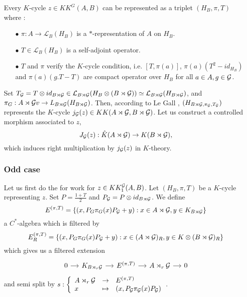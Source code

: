 Every $K$-cycle $z\in KK^G(A,B)$ can be represented as a triplet $(H_B, \pi, T)$ where :
\begin{itemize}
\item[$\bullet$]$\pi : A\rightarrow \mathcal L_B(H_B)$ is a $*$-representation of $A$ on $H_B$.
\item[$\bullet$]$T\in \mathcal L_B(H_B)$ is a self-adjoint operator.
\item[$\bullet$] $T$ and $\pi$ verify the $K$-cycle condition, i.e. $[T,\pi(a)]$, $\pi(a)(T^2-id_{H_B})$ and $\pi(a)(g.T-T)$ are compact operator over $H_B$ for all $a\in A, g\in \mathcal G$.\\
\end{itemize}

Set $T_\mathcal G= T\otimes id_{B\rtimes \mathcal G}\in \mathcal L_{B\rtimes \mathcal G}(H_B\otimes (B\rtimes \mathcal G))\simeq \mathcal L_{B\rtimes \mathcal G}(H_{B\rtimes\mathcal G})$, and $\pi_G: A\rtimes \mathcal G v\rightarrow L_{B\rtimes \mathcal G}(H_{B\rtimes\mathcal G})$. Then, according to Le Gall \cite{LeGall}, $(H_{B\rtimes\mathcal G, \pi_\mathcal G, T_\mathcal G})$ represents the $K$-cycle $j_\mathcal G(z)\in KK(A\rtimes \mathcal G,B\rtimes \mathcal G)$. Let us construct a controlled morphism associated to $z$,
\[J_\mathcal G(z) : \hat K(A\rtimes \mathcal G)\rightarrow K(B\rtimes\mathcal G), \]
which induces right multiplication by $j_\mathcal G(z)$ in $K$-theory.\\

\subsubsection{Odd case}

Let us first do the for work for $z\in KK_1^\mathcal G(A,B)$. Let $(H_B,\pi,T)$ be a $K$-cycle representing $z$. Set $P=\frac{1+T}{2}$ and $P_\mathcal G=P\otimes id_{B\rtimes \mathcal G}$. We define
\[E^{(\pi,T)}=\{(x,P_G\pi_G(x)P_\mathcal G + y) : x\in A\rtimes \mathcal G, y\in K_{B\rtimes\mathcal G}\}\]
a $C^*$-algebra which is filtered by
\[E_R^{(\pi,T)}=\{(x,P_G\pi_G(x)P_\mathcal G + y) : x\in (A\rtimes \mathcal G)_R, y\in K\otimes (B\rtimes\mathcal G)_R\}\]
which gives us a filtered extension
\[\begin{tikzcd}[column sep = small]
0\arrow{r} & K_{B\rtimes_r\G}\arrow{r} & E^{(\pi,T)} \arrow{r} & A\rtimes_r \G \arrow{r}& 0
\end{tikzcd}\]
and semi split by  $s :\left\{\begin{array}{lll}A\rtimes_r \mathcal G & \rightarrow & E^{(\pi,T)} \\ x & \mapsto & (x, P_\mathcal G \pi_\mathcal G(x)P_\mathcal G)\end{array}\right.$.\\

